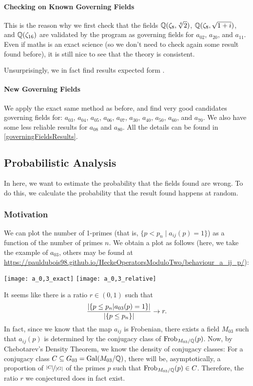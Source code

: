 \paragraph{Checking on Known Governing Fields}
This is the reason why we first check that the fields $\mathbb{Q}(\zeta_8, \sqrt[4]{2})$, $\mathbb{Q}(\zeta_8, \sqrt{1+i})$, and $\mathbb{Q}(\zeta_{16})$ are validated by the program as governing fields for $a_{02}$, $a_{20}$, and $a_{11}$.
Even if maths is an exact science (so we don't need to check again some result found before), it is still nice to see that the theory is consistent.

Unsurprisingly, we in fact find results expected form \cite[§7]{StructureAlgebreHecke}.

\paragraph{New Governing Fields}
We apply the exact same method as before, and find very good candidates governing fields for: $a_{03}$, $a_{04}$, $a_{05}$, $a_{06}$, $a_{07}$, $a_{30}$, $a_{40}$, $a_{50}$, $a_{60}$, and $a_{70}$.
We also have some less reliable results for $a_{08}$ and $a_{80}$.
All the details can be found in \ref{governingFieldsResults}.




\subsection{Probabilistic Analysis}
In here, we want to estimate the probability that the fields found are wrong.
To do this, we calculate the probability that the result found happens at random.

\subsubsection{Motivation}
We can plot the number of 1-primes (that is, $\{ p<p_n \mid a_{ij}(p)=1 \}$) as a function of the number of primes $n$.
We obtain a plot as follows (here, we take the example of $a_{03}$, others may be found at \url{https://pauldubois98.github.io/HeckeOperatorsModuloTwo/behaviour_a_ij_p/}):
\begin{center}
	\texttt{[image: a\_0,3\_exact]}
	\texttt{[image: a\_0,3\_relative]}
\end{center}
It seems like there is a ratio $r \in \left( 0,1 \right)$ such that
$$
\frac{| \{ p \leq p_n | a_{03}(p)=1 \} |} {| \{ p \leq p_n \} |} \to r.
$$
In fact, since we know that the map $a_{ij}$ is Frobenian, there exists a field $M_{03}$ such that $a_{ij}(p)$ is determined by the conjugacy class of $\text{Frob}_{M_{03}/\mathbb{Q}}(p)$.
Now, by Chebotarev's Density Theorem, we know the density of conjugacy classes:
For a conjugacy class $C \subseteq G_{03} = \text{Gal}(M_{03}/\mathbb{Q})$, there will be, asymptotically, a proportion of $\nicefrac{| C |}{| G |}$ of the primes $p$ such that $\text{Frob}_{M_{03}/\mathbb{Q}}(p) \in C$.
Therefore, the ratio $r$ we conjectured does in fact exist.



